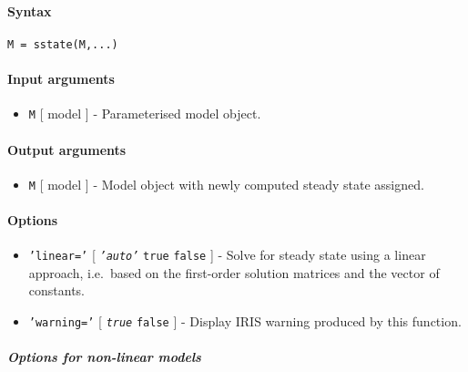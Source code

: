 


	\paragraph{Syntax}

\begin{verbatim}
M = sstate(M,...)
\end{verbatim}

\paragraph{Input arguments}

\begin{itemize}
\itemsep1pt\parskip0pt
\item
  \texttt{M} {[} model {]} - Parameterised model object.
\end{itemize}

\paragraph{Output arguments}

\begin{itemize}
\itemsep1pt\parskip0pt
\item
  \texttt{M} {[} model {]} - Model object with newly computed steady
  state assigned.
\end{itemize}

\paragraph{Options}

\begin{itemize}
\item
  \texttt{'linear='} {[} \emph{\texttt{'auto'}} \textbar{} \texttt{true}
  \textbar{} \texttt{false} {]} - Solve for steady state using a linear
  approach, i.e.~based on the first-order solution matrices and the
  vector of constants.
\item
  \texttt{'warning='} {[} \emph{\texttt{true}} \textbar{} \texttt{false}
  {]} - Display IRIS warning produced by this function.
\end{itemize}

\subparagraph{Options for non-linear
models}

